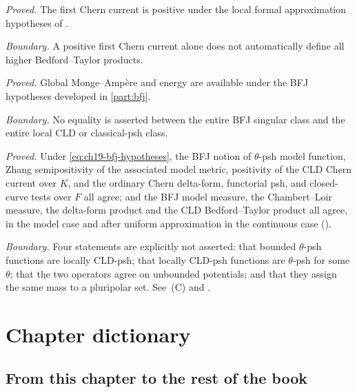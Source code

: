 \begin{description}[style=nextline,leftmargin=0pt,labelindent=0pt,
  labelsep=0pt,itemsep=.8\baselineskip,font=\normalfont\bfseries]
\item[Continuous Zhang-semipositive limit]
\emph{Proved.} The first Chern current is positive under the local formal
approximation hypotheses of \cite[Theorem~1.3]{GJR26}.
\par\emph{Boundary.} A positive first Chern current alone does not
automatically define all higher Bedford--Taylor products.

\item[BFJ singular psh metric]
\emph{Proved.} Global Monge--Amp\`ere and energy are available under the BFJ
hypotheses developed in \cref{part:bfj}.
\par\emph{Boundary.} No equality is asserted between the entire BFJ singular
class and the entire local CLD or classical-psh class.

\item[CLD versus BFJ on the model and continuous loci]
\emph{Proved.} Under \eqref{eq:ch19-bfj-hypotheses}, the BFJ notion of
$\theta$-psh model function, Zhang semipositivity of the associated model
metric, positivity of the CLD Chern current over $K$, and the ordinary Chern
delta-form, functorial psh, and closed-curve tests over $F$ all agree;
and the BFJ model
measure, the Chambert--Loir measure, the delta-form product and the CLD
Bedford--Taylor product all agree, in the model case and after uniform
approximation in the continuous case
().
\par\emph{Boundary.} Four statements are explicitly not asserted:
that bounded $\theta$-psh functions are locally CLD-psh; that locally
CLD-psh functions are $\theta$-psh for some $\theta$; that the two
operators agree on unbounded potentials; and that they assign the same mass
to a pluripolar set.  See \,(C) and
.
\end{description}

\section{Chapter dictionary}
\label{sec:ch19-dictionary}

\subsection{From this chapter to the rest of the book}
\label{sec:ch19-dict-forward}

